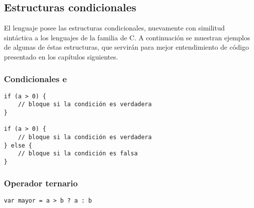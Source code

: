 \subsection{Estructuras condicionales}

El lenguaje posee las estructuras condicionales, nuevamente con similitud sintáctica a los lenguajes de la familia de C. A continuación se muestran ejemplos de algunas de éstas estructuras, que servirán para mejor entendimiento de código presentado en los capítulos siguientes.

\subsubsection{Condicionales  e }

\begin{lstlisting}[title={Ejemplos de \code{if} e \code{if-else}}]
if (a > 0) {
	// bloque si la condición es verdadera 
}

if (a > 0) {
	// bloque si la condición es verdadera
} else {
	// bloque si la condición es falsa
}
\end{lstlisting}

\subsubsection{Operador ternario }

\begin{lstlisting}[title={Operador ternario \code{?:}}]
var mayor = a > b ? a : b
\end{lstlisting}